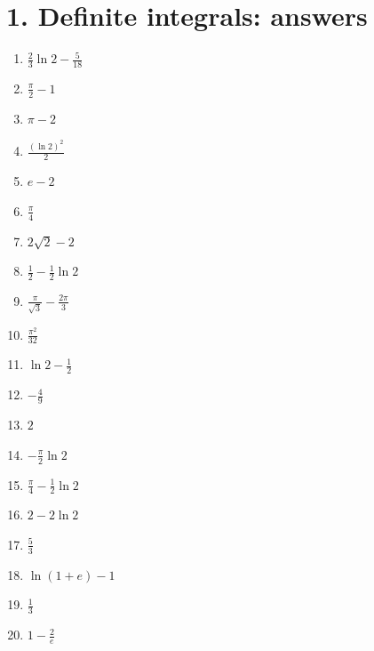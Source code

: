 \documentclass[11pt,a4paper]{article}
\begin{document}
\section*{1. Definite integrals: answers}
\begin{enumerate}
    \item $\displaystyle \frac{2}{3}\ln 2-\frac{5}{18}$
    \item $\displaystyle \frac{\pi}{2}-1$
    \item $\displaystyle \pi-2$
    \item $\displaystyle \frac{(\ln 2)^2}{2}$
    \item $\displaystyle e-2$
    \item $\displaystyle \frac{\pi}{4}$
    \item $\displaystyle 2\sqrt{2}-2$
    \item $\displaystyle \frac{1}{2}-\frac{1}{2}\ln 2$
    \item $\displaystyle \frac{\pi}{\sqrt{3}}-\frac{2\pi}{3}$
    \item $\displaystyle \frac{\pi^2}{32}$
    \item $\displaystyle \ln 2-\frac{1}{2}$
    \item $\displaystyle -\frac{4}{9}$
    \item $\displaystyle 2$
    \item $\displaystyle -\frac{\pi}{2}\ln 2$
    \item $\displaystyle \frac{\pi}{4}-\frac{1}{2}\ln 2$
    \item $\displaystyle 2-2\ln 2$
    \item $\displaystyle \frac{5}{3}$
    \item $\displaystyle \ln(1+e)-1$
    \item $\displaystyle \frac{1}{3}$
    \item $\displaystyle 1-\frac{2}{e}$
\end{enumerate}
\end{document}
